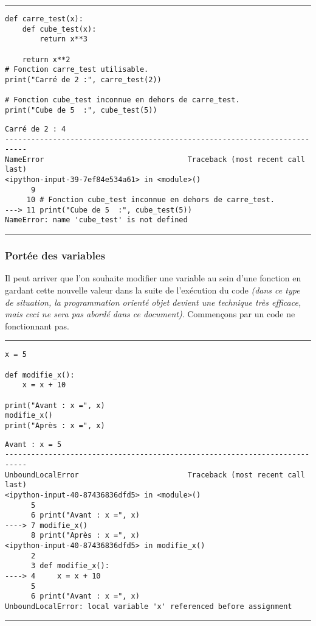 \bigskip
{\hrule height .5mm}
\begin{verbatim}
def carre_test(x):
    def cube_test(x):
        return x**3

    return x**2
# Fonction carre_test utilisable.
print("Carré de 2 :", carre_test(2))

# Fonction cube_test inconnue en dehors de carre_test.
print("Cube de 5  :", cube_test(5))
\end{verbatim}
 \color{ForestGreen}
\vspace{-1.5em}
\begin{verbatim}
Carré de 2 : 4
---------------------------------------------------------------------------
NameError                                 Traceback (most recent call last)
<ipython-input-39-7ef84e534a61> in <module>()
      9 
     10 # Fonction cube_test inconnue en dehors de carre_test.
---> 11 print("Cube de 5  :", cube_test(5))
NameError: name 'cube_test' is not defined
\end{verbatim} \color{Black}
{\hrule height .5mm}
\bigskip


\subsubsection{Portée des variables}

Il peut arriver que l'on souhaite modifier une variable au sein d'une fonction en gardant cette nouvelle valeur dans la suite de l'exécution du code \textit{(dans ce type de situation, la programmation orienté objet devient une technique très efficace, mais ceci ne sera pas abordé dans ce document)}. Commençons par un code ne fonctionnant pas.


\bigskip
{\hrule height .5mm}
\begin{verbatim}
x = 5

def modifie_x():
    x = x + 10

print("Avant : x =", x)
modifie_x()
print("Après : x =", x)
\end{verbatim}
 \color{ForestGreen}
\vspace{-1.5em}
\begin{verbatim}
Avant : x = 5
---------------------------------------------------------------------------
UnboundLocalError                         Traceback (most recent call last)
<ipython-input-40-87436836dfd5> in <module>()
      5 
      6 print("Avant : x =", x)
----> 7 modifie_x()
      8 print("Après : x =", x)
<ipython-input-40-87436836dfd5> in modifie_x()
      2 
      3 def modifie_x():
----> 4     x = x + 10
      5 
      6 print("Avant : x =", x)
UnboundLocalError: local variable 'x' referenced before assignment
\end{verbatim} \color{Black}
{\hrule height .5mm}
\bigskip


